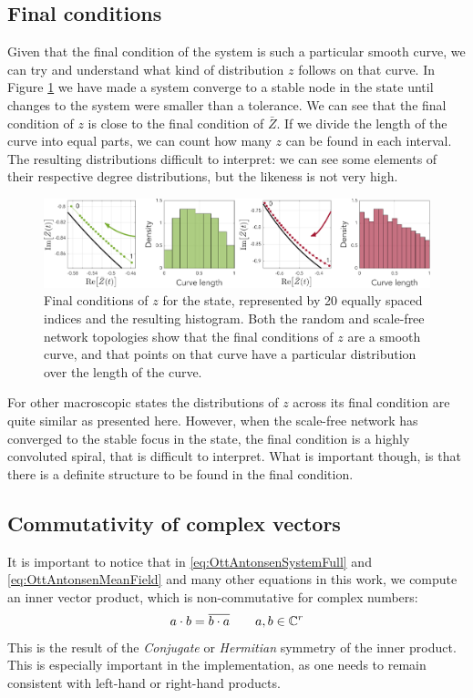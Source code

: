 \subsection{Final conditions}
Given that the final condition of the system is such a particular smooth curve, we can try and understand what kind of distribution $z$ follows on that curve. In Figure \ref{fig:FinalConditions} we have made a system converge to a stable node in the \PSR state until changes to the system were smaller than a tolerance. We can see that the final condition of $z$ is close to the final condition of $\bar{Z}$. If we divide the length of the curve into equal parts, we can count how many $z$ can be found in each interval. The resulting distributions difficult to interpret: we can see some elements of their respective degree distributions, but the likeness is not very high. 
\begin{figure}[H]
\centering
\includegraphics[width = \textwidth]{../Figures/Distributions/FinalConditions.pdf}
\caption{Final conditions of $z$ for the \PSR state, represented by 20 equally spaced indices and the resulting histogram. Both the random and scale-free network topologies show that the final conditions of $z$ are a smooth curve, and that points on that curve have a particular distribution over the length of the curve.}
\label{fig:FinalConditions}
\end{figure}

For other macroscopic states the distributions of $z$ across its final condition are quite similar as presented here. However, when the scale-free network has converged to the stable focus in the \PSS state, the final condition is a highly convoluted spiral, that is difficult to interpret. What is important though, is that there is a definite structure to be found in the final condition.


\subsection{Commutativity of complex vectors} 
It is important to notice that in \eqref{eq:OttAntonsenSystemFull} and \eqref{eq:OttAntonsenMeanField} and many other equations in this work, we compute an inner vector product, which is non-commutative for complex numbers:
\begin{align}
a \cdot b = \overline{b \cdot a} \qquad a, b \in {\mathbb{C}}^r
\end{align}
This is the result of the \textsl{Conjugate} or \textsl{Hermitian} symmetry of the inner product. This is especially important in the \matlab implementation, as one needs to remain consistent with left-hand or right-hand products.



